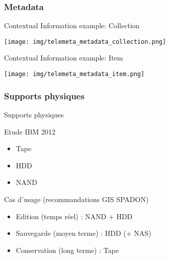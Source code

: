 \documentclass[final, hyperref, table]{beamer}
\begin{document}
\subsubsection{Metadata}
\begin{frame}[label=metadata_example]{Contextual Information example: Collection}
  \begin{center}
    \texttt{[image: img/telemeta\_metadata\_collection.png]}
  \end{center}
\href{http://archives.crem-cnrs.fr/archives/collections/CNRSMH_E_1998_017_001/}{}
 \href{./captures/Collection.html}{}
\hyperlink{telemeta_metadata}{}
\end{frame}
\begin{frame}{Contextual Information example: Item}
  \begin{center}
    \texttt{[image: img/telemeta\_metadata\_item.png]}
  \end{center}
  \href{http://archives.crem-cnrs.fr/archives/items/CNRSMH_E_1998_017_001_001_01/}{}
 \href{./captures/Item.html}{}
\hyperlink{telemeta_metadata}{}
\end{frame}


\subsubsection{Supports physiques}
\begin{frame}{Supports physiques}
  \begin{block}{Etude IBM 2012}
    \begin{itemize}
    \item Tape
    \item HDD
    \item NAND
    \end{itemize}
    \end{block}

\href{http://www.digitalpreservation.gov/meetings/documents/storage12/5-Fontana-StorageMediaDenstiyfoRNANDTAPE.pdf}{}

\begin{block}{Cas d'usage (recommandations GIS SPADON)}
    \begin{itemize}
    \item Edition (temps réel) : NAND + HDD 
    \item Sauvegarde (moyen terme) : HDD (+ NAS)
    \item Conservation (long terme) : Tape
    \end{itemize}
    \end{block}
\end{frame}

\end{document}
